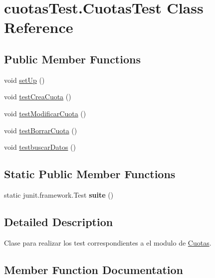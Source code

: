 \hypertarget{classcuotas_test_1_1_cuotas_test}{}\section{cuotas\+Test.\+Cuotas\+Test Class Reference}
\label{classcuotas_test_1_1_cuotas_test}
\subsection*{Public Member Functions}
\begin{DoxyCompactItemize}
\item 
void \hyperlink{classcuotas_test_1_1_cuotas_test_a67b2920f4cb10cae716486bfea331184}{set\+Up} ()
\item 
void \hyperlink{classcuotas_test_1_1_cuotas_test_a594526f9f25fa57a58272b2fb8d43b37}{test\+Crea\+Cuota} ()
\item 
void \hyperlink{classcuotas_test_1_1_cuotas_test_a6cd5db403bf04a6b31ddef6b50ed8e2b}{test\+Modificar\+Cuota} ()
\item 
void \hyperlink{classcuotas_test_1_1_cuotas_test_adb5e9b747bfd96f4a57787f824cb67a3}{test\+Borrar\+Cuota} ()
\item 
void \hyperlink{classcuotas_test_1_1_cuotas_test_a00bbb04863fcc1ac305bea0a144df2f8}{testbuscar\+Datos} ()
\end{DoxyCompactItemize}
\subsection*{Static Public Member Functions}
\begin{DoxyCompactItemize}
\item 
\mbox{\label{classcuotas_test_1_1_cuotas_test_ad2ecc6500689c7d89400973eadd99518}} 
static junit.\+framework.\+Test {\bfseries suite} ()
\end{DoxyCompactItemize}


\subsection{Detailed Description}
Clase para realizar los test correspondientes a el modulo de \hyperlink{namespace_cuotas}{Cuotas}. 

\subsection{Member Function Documentation}
\mbox{\label{classcuotas_test_1_1_cuotas_test_a67b2920f4cb10cae716486bfea331184}} 
